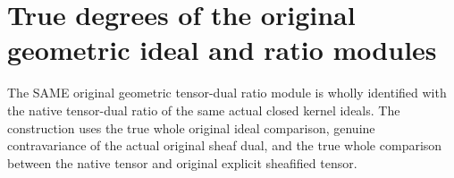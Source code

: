 \section{True degrees of the original geometric ideal and ratio modules}

\begin{definition}
\label{def:fc-geometric-ideal-ratio-kernel}
\leanok
{}
The SAME original geometric tensor-dual ratio module is wholly identified
with the native tensor-dual ratio of the same actual closed kernel ideals.
The construction uses the true whole original ideal comparison, genuine
contravariance of the actual original sheaf dual, and the true whole
comparison between the native tensor and original explicit sheafified tensor.
\end{definition}

